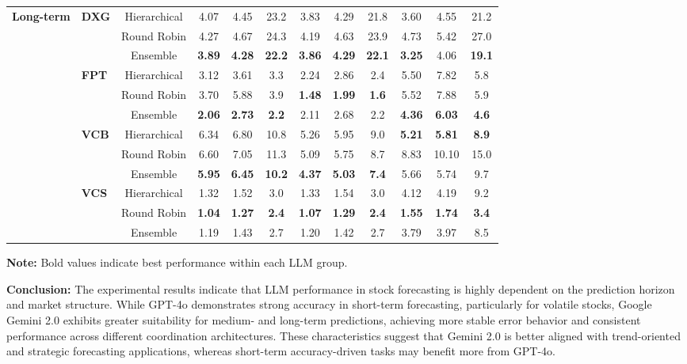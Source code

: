 \begin{table}[!h]
\begin{tabular}{llcccc|ccc|ccc}
\multirow{12}{*}{\textbf{Long-term}}
& \multirow{3}{*}{\textbf{DXG}} & Hierarchical & 4.07 & 4.45 & 23.2 & 3.83 & 4.29 & 21.8 & 3.60 & 4.55 & 21.2 \\
& & Round Robin & 4.27 & 4.67 & 24.3 & 4.19 & 4.63 & 23.9 & 4.73 & 5.42 & 27.0 \\
& & Ensemble & \textbf{3.89} & \textbf{4.28} & \textbf{22.2} & \textbf{3.86} & \textbf{4.29} & \textbf{22.1} & \textbf{3.25} & 4.06 & \textbf{19.1} \\
& \multirow{3}{*}{\textbf{FPT}} & Hierarchical & 3.12 & 3.61 & 3.3 & 2.24 & 2.86 & 2.4 & 5.50 & 7.82 & 5.8 \\
& & Round Robin & 3.70 & 5.88 & 3.9 & \textbf{1.48} & \textbf{1.99} & \textbf{1.6} & 5.52 & 7.88 & 5.9 \\
& & Ensemble & \textbf{2.06} & \textbf{2.73} & \textbf{2.2} & 2.11 & 2.68 & 2.2 & \textbf{4.36} & \textbf{6.03} & \textbf{4.6} \\
& \multirow{3}{*}{\textbf{VCB}} & Hierarchical & 6.34 & 6.80 & 10.8 & 5.26 & 5.95 & 9.0 & \textbf{5.21} & \textbf{5.81} & \textbf{8.9} \\
& & Round Robin & 6.60 & 7.05 & 11.3 & 5.09 & 5.75 & 8.7 & 8.83 & 10.10 & 15.0 \\
& & Ensemble & \textbf{5.95} & \textbf{6.45} & \textbf{10.2} & \textbf{4.37} & \textbf{5.03} & \textbf{7.4} & 5.66 & 5.74 & 9.7 \\
& \multirow{3}{*}{\textbf{VCS}} & Hierarchical & 1.32 & 1.52 & 3.0 & 1.33 & 1.54 & 3.0 & 4.12 & 4.19 & 9.2 \\
& & Round Robin & \textbf{1.04} & \textbf{1.27} & \textbf{2.4} & \textbf{1.07} & \textbf{1.29} & \textbf{2.4} & \textbf{1.55} & \textbf{1.74} & \textbf{3.4} \\
& & Ensemble & 1.19 & 1.43 & 2.7 & 1.20 & 1.42 & 2.7 & 3.79 & 3.97 & 8.5 \\

\bottomrule
\end{tabular}

\vspace{0.3cm}
\footnotesize
\textbf{Note:} Bold values indicate best performance within each LLM group.
\end{table}

\noindent\textbf{Conclusion:} The experimental results indicate that LLM performance in stock forecasting is highly dependent on the prediction horizon and market structure. While GPT-4o demonstrates strong accuracy in short-term forecasting, particularly for volatile stocks, Google Gemini 2.0 exhibits greater suitability for medium- and long-term predictions, achieving more stable error behavior and consistent performance across different coordination architectures. These characteristics suggest that Gemini 2.0 is better aligned with trend-oriented and strategic forecasting applications, whereas short-term accuracy-driven tasks may benefit more from GPT-4o.
